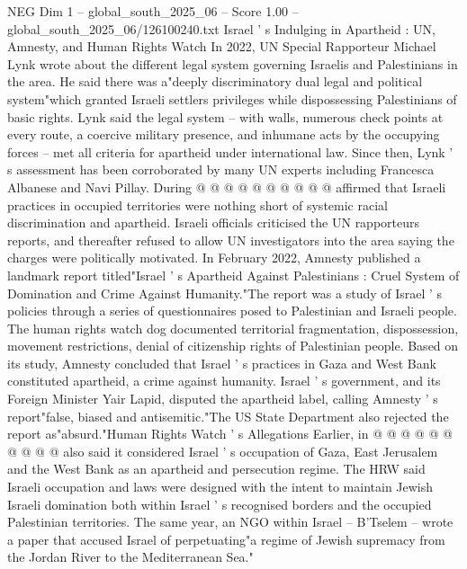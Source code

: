 \begin{textsample}{NEG Dim 1 – global\_south\_2025\_06 – Score 1.00 – global\_south\_2025\_06/126100240.txt}
Israel ' s Indulging in Apartheid : UN, Amnesty, and Human Rights Watch In 2022, UN Special Rapporteur Michael Lynk wrote about the different legal system governing Israelis and Palestinians in the area.
He said there was a"deeply discriminatory dual legal and political system"which granted Israeli settlers privileges while dispossessing Palestinians of basic rights.
Lynk said the legal system -- with walls, numerous check points at every route, a coercive military presence, and inhumane acts by the occupying forces -- met all criteria for apartheid under international law.
Since then, Lynk ' s assessment has been corroborated by many UN experts including Francesca Albanese and Navi Pillay.
During @ @ @ @ @ @ @ @ @ @ affirmed that Israeli practices in occupied territories were nothing short of systemic racial discrimination and apartheid.
Israeli officials criticised the UN rapporteurs reports, and thereafter refused to allow UN investigators into the area saying the charges were politically motivated.
In February 2022, Amnesty published a landmark report titled"Israel ' s Apartheid Against Palestinians : Cruel System of Domination and Crime Against Humanity."The report was a study of Israel ' s policies through a series of questionnaires posed to Palestinian and Israeli people.
The human rights watch dog documented territorial fragmentation, dispossession, movement restrictions, denial of citizenship rights of Palestinian people.
Based on its study, Amnesty concluded that Israel ' s practices in Gaza and West Bank constituted apartheid, a crime against humanity.
Israel ' s government, and its Foreign Minister Yair Lapid, disputed the apartheid label, calling Amnesty ' s report"false, biased and antisemitic."The US State Department also rejected the report as"absurd."Human Rights Watch ' s Allegations Earlier, in @ @ @ @ @ @ @ @ @ @ also said it considered Israel ' s occupation of Gaza, East Jerusalem and the West Bank as an apartheid and persecution regime.
The HRW said Israeli occupation and laws were designed with the intent to maintain Jewish Israeli domination both within Israel ' s recognised borders and the occupied Palestinian territories.
The same year, an NGO within Israel -- B'Tselem -- wrote a paper that accused Israel of perpetuating"a regime of Jewish supremacy from the Jordan River to the Mediterranean Sea."

\end{textsample}

